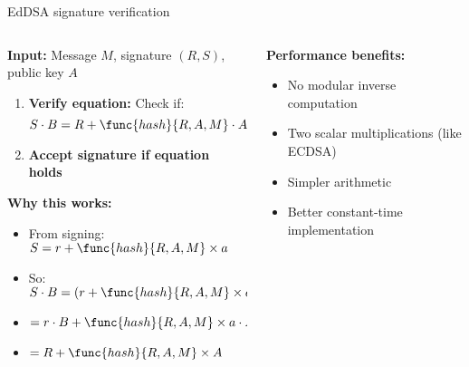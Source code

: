\documentclass[aspectratio=169, lualatex, handout]{beamer}
\begin{document}
\begin{frame}{EdDSA signature verification}
	\begin{columns}
		\begin{column}{0.6\textwidth}
			\textbf{Input:} Message $M$, signature $(R, S)$, public key $A$
			\begin{enumerate}[<+->]
				\item \textbf{Verify equation:} Check if:
				      $$S \cdot B = R + \func{hash}{R, A, M} \cdot A$$
				\item \textbf{Accept signature if equation holds}
			\end{enumerate}
			\vspace{0.5cm}
			\textbf{Why this works:}
			\begin{itemize}[<+->]
				\item From signing: $S = r + \func{hash}{R, A, M} \times a$
				\item So: $S \cdot B = (r + \func{hash}{R, A, M} \times a) \cdot B$
				\item $= r \cdot B + \func{hash}{R, A, M} \times a \cdot B$
				\item $= R + \func{hash}{R, A, M} \times A$
			\end{itemize}
		\end{column}
		\begin{column}{0.4\textwidth}
			\textbf{Performance benefits:}
			\begin{itemize}[<+->]
				\item No modular inverse computation
				\item Two scalar multiplications (like ECDSA)
				\item Simpler arithmetic
				\item Better constant-time implementation
			\end{itemize}
		\end{column}
	\end{columns}
\end{frame}
\end{document}
